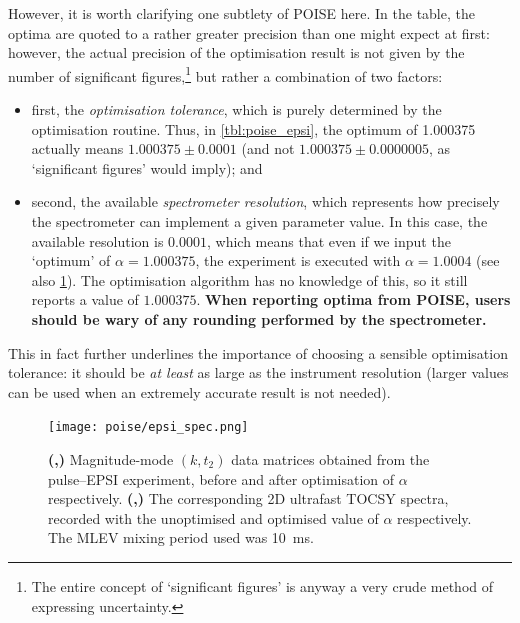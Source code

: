 However, it is worth clarifying one subtlety of POISE here.
In the table, the optima are quoted to a rather greater precision than one might expect at first: however, the actual precision of the optimisation result is not given by the number of significant figures,\footnote{The entire concept of `significant figures' is anyway a very crude method of expressing uncertainty.} but rather a combination of two factors:

\begin{itemize}
    \item first, the \textit{optimisation tolerance}, which is purely determined by the optimisation routine. Thus, in \cref{tbl:poise_epsi}, the optimum of 1.000375 actually means $1.000375 \pm 0.0001$ (and not $1.000375 \pm 0.0000005$, as `significant figures' would imply); and
    \item second, the available \textit{spectrometer resolution}, which represents how precisely the spectrometer can implement a given parameter value.
        In this case, the available resolution is $0.0001$, which means that even if we input the `optimum' of $\alpha = 1.000375$, the experiment is executed with $\alpha = 1.0004$ (see also \cref{fig:epsi_spec}).
        The optimisation algorithm has no knowledge of this, so it still reports a value of $1.000375$.
        \textbf{When reporting optima from POISE, users should be wary of any rounding performed by the spectrometer.}
\end{itemize}

This in fact further underlines the importance of choosing a sensible optimisation tolerance: it should be \textit{at least} as large as the instrument resolution (larger values can be used when an extremely accurate result is not needed).

\begin{figure}[htb]
    \centering
    \texttt{[image: poise/epsi\_spec.png]}%
    {\label{fig:epsi_spec_kt_noopt}}%
    {\label{fig:epsi_spec_kt_opt}}%
    {\label{fig:epsi_spec_tocsy_noopt}}%
    {\label{fig:epsi_spec_tocsy_opt}}%
    \caption[Comparison between unoptimised and optimised EPSI spectra]{
        \textbf{(,)} Magnitude-mode $(k, t_2)$ data matrices obtained from the pulse--EPSI experiment, before and after optimisation of $\alpha$ respectively.
        \textbf{(,)} The corresponding 2D ultrafast TOCSY spectra, recorded with the unoptimised and optimised value of $\alpha$ respectively.
        The MLEV mixing period used was \qty{10}{\ms}.
    }
    \label{fig:epsi_spec}
\end{figure}

